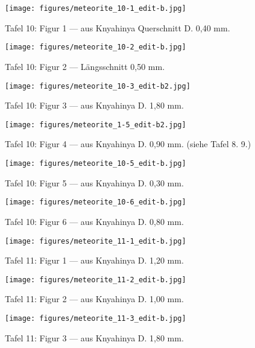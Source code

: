 \documentclass[a4paper, 12pt, oneside]{article}
\begin{document}
\clearpage
{}
\begin{figure}[t]
\texttt{[image: figures/meteorite\_10-1\_edit-b.jpg]}
\caption{Tafel 10: Figur 1 --- aus Knyahinya Querschnitt D. 0,40 mm.}
\centering
\end{figure}
\clearpage
\begin{figure}[t]
\texttt{[image: figures/meteorite\_10-2\_edit-b.jpg]}
\caption{Tafel 10: Figur 2 --- Längsschnitt 0,50 mm.}
\centering
\end{figure}
\clearpage
\begin{figure}[t]
\texttt{[image: figures/meteorite\_10-3\_edit-b2.jpg]}
\caption{Tafel 10: Figur 3 --- aus Knyahinya D. 1,80 mm.}
\centering
\end{figure}
\clearpage
\begin{figure}[t]
\texttt{[image: figures/meteorite\_1-5\_edit-b2.jpg]}
\caption{Tafel 10: Figur 4 --- aus Knyahinya D. 0,90 mm. (siehe Tafel 8. 9.)}
\centering
\end{figure}
\clearpage
\begin{figure}[t]
\texttt{[image: figures/meteorite\_10-5\_edit-b.jpg]}
\caption{Tafel 10: Figur 5 --- aus Knyahinya D. 0,30 mm.}
\centering
\end{figure}
\clearpage
\begin{figure}[t]
\texttt{[image: figures/meteorite\_10-6\_edit-b.jpg]}
\caption{Tafel 10: Figur 6 --- aus Knyahinya D. 0,80 mm.}
\centering
\end{figure}
\clearpage
{}
\begin{figure}[t]
\texttt{[image: figures/meteorite\_11-1\_edit-b.jpg]}
\caption{Tafel 11: Figur 1 --- aus Knyahinya D. 1,20 mm.}
\centering
\end{figure}
\clearpage
\begin{figure}[t]
\texttt{[image: figures/meteorite\_11-2\_edit-b.jpg]}
\caption{Tafel 11: Figur 2 --- aus Knyahinya D. 1,00 mm.}
\centering
\end{figure}
\clearpage
\begin{figure}[t]
\texttt{[image: figures/meteorite\_11-3\_edit-b.jpg]}
\caption{Tafel 11: Figur 3 --- aus Knyahinya D. 1,80 mm.}
\centering
\end{figure}
\end{document}
